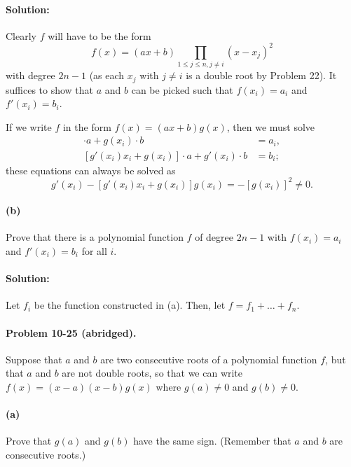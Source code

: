 \documentclass{article}
\begin{document}
\paragraph{Solution:} Clearly $f$ will have to be the form \begin{equation*}
  f(x) = (ax + b)\prod_{1 \leq j \leq n, j \neq i}{(x - x_j)^2}
\end{equation*} with degree $2n - 1$ (as each $x_j$ with $j \neq i$ is a double
root by Problem 22). It suffices to show that $a$ and $b$ can be picked such
that $f(x_i) = a_i$ and $f'(x_i) = b_i$.

If we write $f$ in the form $f(x) = (ax + b)g(x)$, then we must solve
\begin{align*}
  [g(x_i)x_i] \cdot a + g(x_i) \cdot b &= a_i, \\
  [g'(x_i)x_i + g(x_i)] \cdot a + g'(x_i) \cdot b &= b_i;
\end{align*} these equations can always be solved as \begin{equation*}
  [g(x_i)x_i]g'(x_i) - [g'(x_i)x_i + g(x_i)]g(x_i) = -[g(x_i)]^2 \neq 0.
\end{equation*}

\paragraph{(b)} Prove that there is a polynomial function $f$ of degree $2n -
1$ with $f(x_i) = a_i$ and $f'(x_i) = b_i$ for all $i$.

\paragraph{Solution:} Let $f_i$ be the function constructed in (a). Then, let
$f = f_1 + \ldots + f_n$.

\paragraph{Problem 10-25 (abridged).} Suppose that $a$ and $b$ are two
consecutive roots of a polynomial function $f$, but that $a$ and $b$ are not
double roots, so that we can write $f(x) = (x - a)(x - b)g(x)$ where $g(a) \neq
0$ and $g(b) \neq 0$.

\paragraph{(a)} Prove that $g(a)$ and $g(b)$ have the same sign. (Remember that
$a$ and $b$ are consecutive roots.)
\end{document}
